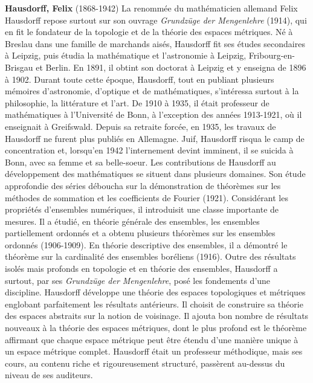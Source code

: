 \textbf{Hausdorff, Felix} (1868-1942) La renommée du mathématicien allemand Felix Hausdorff repose surtout sur son ouvrage \textit{Grundzüge der Mengenlehre} (1914), qui en fit le fondateur de la topologie et de la théorie des espaces métriques. Né à Breslau dans une famille de marchands aisés, Hausdorff fit ses études secondaires à Leipzig, puis étudia la mathématique et l'astronomie à Leipzig, Fribourg-en-Brisgau et Berlin. En 1891, il obtint son doctorat à Leipzig et y enseigna de 1896 à 1902. Durant toute cette époque, Hausdorff, tout en publiant plusieurs mémoires d'astronomie, d'optique et de mathématiques, s'intéressa surtout à la philosophie, la littérature et l'art. De 1910 à 1935, il était professeur de mathématiques à l'Université de Bonn, à l'exception des années 1913-1921, où il enseignait à Greifswald. Depuis sa retraite forcée, en 1935, les travaux de Hausdorff ne furent plus publiés en Allemagne. Juif, Hausdorff risqua le camp de concentration et, lorsqu'en 1942 l'internement devint imminent, il se suicida à Bonn, avec sa femme et sa belle-soeur. Les contributions de Hausdorff au développement des mathématiques se situent dans plusieurs domaines. Son étude approfondie des séries déboucha sur la démonstration de théorèmes sur les méthodes de sommation et les coefficients de Fourier (1921). Considérant les propriétés d'ensembles numériques, il introduisit une classe importante de mesures. Il a étudié, en théorie générale des ensembles, les ensembles partiellement ordonnés et a obtenu plusieurs théorèmes sur les ensembles ordonnés (1906-1909). En théorie descriptive des ensembles, il a démontré le théorème sur la cardinalité des ensembles boréliens (1916). Outre des résultats isolés mais profonds en topologie et en théorie des ensembles, Hausdorff a surtout, par ses \textit{Grundzüge der Mengenlehre}, posé les fondements d'une discipline. Hausdorff développe une théorie des espaces topologiques et métriques englobant parfaitement les résultats antérieurs. Il choisit de construire sa théorie des espaces abstraits sur la notion de voisinage. Il ajouta bon nombre de résultats nouveaux à la théorie des espaces métriques, dont le plus profond est le théorème affirmant que chaque espace métrique peut être étendu d'une manière unique à un espace métrique complet. Hausdorff était un professeur méthodique, mais ses cours, au contenu riche et rigoureusement structuré, passèrent au-dessus du niveau de ses auditeurs.

